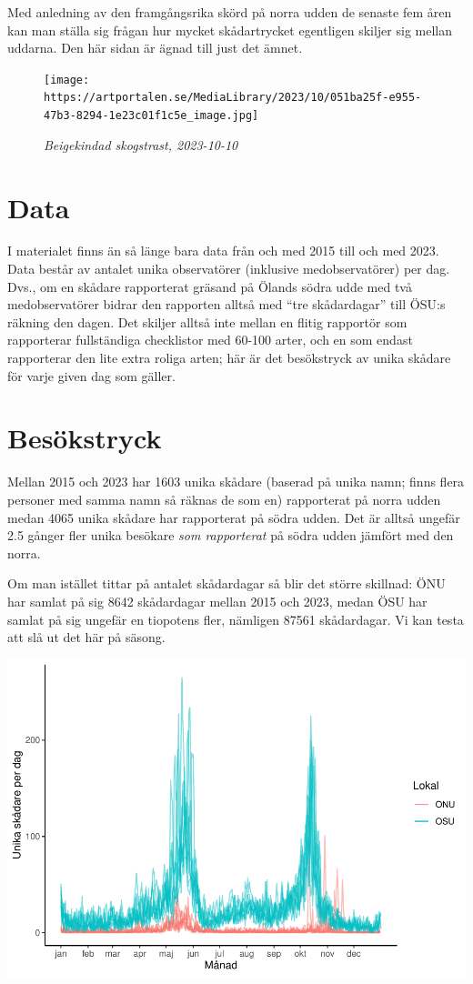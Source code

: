 \documentclass[
]{book}
\begin{document}
Med anledning av den framgångsrika skörd på norra udden de senaste fem åren kan man ställa sig frågan hur mycket skådartrycket egentligen skiljer sig mellan uddarna. Den här sidan är ägnad till just det ämnet.

\begin{figure}
\centering
\texttt{[image: https://artportalen.se/MediaLibrary/2023/10/051ba25f-e955-47b3-8294-1e23c01f1c5e\_image.jpg]}
\caption{\emph{Beigekindad skogstrast, 2023-10-10}}
\end{figure}

\hypertarget{data}{%
\section{Data}\label{data}}

I materialet finns än så länge bara data från och med 2015 till och med 2023. Data består av antalet unika observatörer (inklusive medobservatörer) per dag. Dvs., om en skådare rapporterat gräsand på Ölands södra udde med två medobservatörer bidrar den rapporten alltså med ``tre skådardagar'' till ÖSU:s räkning den dagen. Det skiljer alltså inte mellan en flitig rapportör som rapporterar fullständiga checklistor med 60-100 arter, och en som endast rapporterar den lite extra roliga arten; här är det besökstryck av unika skådare för varje given dag som gäller.

\hypertarget{besuxf6kstryck}{%
\section{Besökstryck}\label{besuxf6kstryck}}

Mellan 2015 och 2023 har 1603 unika skådare (baserad på unika namn; finns flera personer med samma namn så räknas de som en) rapporterat på norra udden medan 4065 unika skådare har rapporterat på södra udden. Det är alltså ungefär 2.5 gånger fler unika besökare \emph{som rapporterat} på södra udden jämfört med den norra.

Om man istället tittar på antalet skådardagar så blir det större skillnad: ÖNU har samlat på sig 8642 skådardagar mellan 2015 och 2023, medan ÖSU har samlat på sig ungefär en tiopotens fler, nämligen 87561 skådardagar. Vi kan testa att slå ut det här på säsong.

\includegraphics{_main_files/figure-latex/unnamed-chunk-3-1.pdf}
\end{document}

